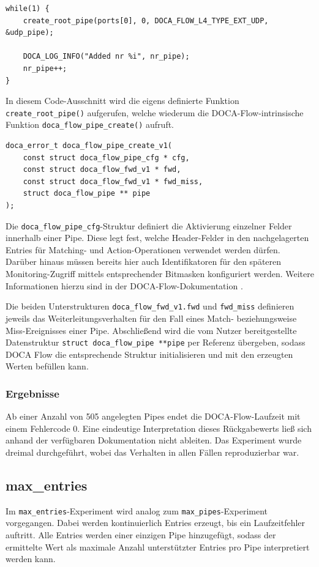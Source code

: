 \documentclass[paper=a4, fontsize=11pt]{scrartcl} %
\numberwithin{equation}{section} %
\numberwithin{figure}{section} %
\numberwithin{table}{section} %
\begin{document}
\begin{verbatim}
while(1) {
    create_root_pipe(ports[0], 0, DOCA_FLOW_L4_TYPE_EXT_UDP, &udp_pipe);

    DOCA_LOG_INFO("Added nr %i", nr_pipe);
    nr_pipe++;
}
\end{verbatim}
In diesem Code-Ausschnitt wird die eigens definierte Funktion \texttt{create\_root\_pipe()} aufgerufen, welche wiederum die DOCA-Flow-intrinsische Funktion \texttt{doca\_flow\_pipe\_create()} aufruft.
\begin{verbatim}
doca_error_t doca_flow_pipe_create_v1(
    const struct doca_flow_pipe_cfg * cfg, 
    const struct doca_flow_fwd_v1 * fwd, 
    const struct doca_flow_fwd_v1 * fwd_miss, 
    struct doca_flow_pipe ** pipe
);
\end{verbatim}
Die \texttt{doca\_flow\_pipe\_cfg}-Struktur definiert die Aktivierung einzelner Felder innerhalb einer Pipe. Diese legt fest, welche Header-Felder in den nachgelagerten Entries für Matching- und Action-Operationen verwendet werden dürfen. Darüber hinaus müssen bereits hier auch Identifikatoren für den späteren Monitoring-Zugriff mittels entsprechender Bitmasken konfiguriert werden. Weitere Informationen hierzu sind in der DOCA-Flow-Dokumentation \cite{nvidia_doca_flow_architecture}. 

Die beiden Unterstrukturen \texttt{doca\_flow\_fwd\_v1.fwd} und \texttt{fwd\_miss} definieren jeweils das Weiterleitungsverhalten für den Fall eines Match- beziehungsweise Miss-Ereignisses einer Pipe. Abschließend wird die vom Nutzer bereitgestellte Datenstruktur \texttt{struct doca\_flow\_pipe **pipe} per Referenz übergeben, sodass DOCA Flow die entsprechende Struktur initialisieren und mit den erzeugten Werten befüllen kann.

\subsubsection*{Ergebnisse}

Ab einer Anzahl von 505 angelegten Pipes endet die DOCA-Flow-Laufzeit mit einem Fehlercode 0. Eine eindeutige Interpretation dieses Rückgabewerts ließ sich anhand der verfügbaren Dokumentation nicht ableiten. Das Experiment wurde dreimal durchgeführt, wobei das Verhalten in allen Fällen reproduzierbar war.
\newpage
\subsection{max\_entries}
Im \texttt{max\_entries}-Experiment wird analog zum \texttt{max\_pipes}-Experiment vorgegangen. Dabei werden kontinuierlich Entries erzeugt, bis ein Laufzeitfehler auftritt. Alle Entries werden einer einzigen Pipe hinzugefügt, sodass der ermittelte Wert als maximale Anzahl unterstützter Entries pro Pipe interpretiert werden kann.
\end{document}
